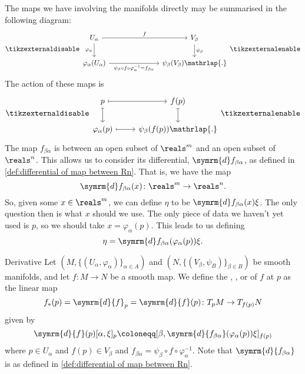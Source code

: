 \documentclass[fleqn]{NotesClass}
\renewcommand{\dl}{\symrm{d}}
\begin{document}
    The maps we have involving the manifolds directly may be summarised in the following diagram:
    \begin{equation}
        \tikzexternaldisable
        \begin{tikzcd}[column sep=2.5cm]
            U_\alpha \arrow[r, "f"] \arrow[d, "\varphi_\alpha"'] & V_\beta \arrow[d, "\psi_\beta"]\\
            \varphi_\alpha(U_\alpha) \arrow[r, "\psi_\beta \circ f \circ \varphi_\alpha^{-1} = f_{\beta\alpha}"'] & \psi_\beta(V_\beta)\mathrlap{.}
        \end{tikzcd}
        \tikzexternalenable
    \end{equation}
    The action of these maps is
    \begin{equation}
        \tikzexternaldisable
        \begin{tikzcd}
            p \arrow[r, mapsto] \arrow[d, mapsto] & f(p) \arrow[d, mapsto]\\
            \varphi_\alpha(p) \arrow[r, mapsto] & \psi_\beta(f(p))\mathrlap{.}
        \end{tikzcd}
        \tikzexternalenable
    \end{equation}
    The map \(f_{\beta\alpha}\) is between an open subset of \(\reals^m\) and an open subset of \(\reals^n\).
    This allows us to consider its differential, \(\dl f_{\beta\alpha}\), as defined in \cref{def:differential of map between Rn}.
    That is, we have the map
    \begin{equation}
        \dl f_{\beta\alpha}(x) \colon \reals^m \to \reals^n.
    \end{equation}
    So, given some \(x \in \reals^m\), we can define \(\eta\) to be \(\dl f_{\beta\alpha}(x)\xi\).
    The only question then is what \(x\) should we use.
    The only piece of data we haven't yet used is \(p\), so we should take \(x = \varphi_\alpha(p)\).
    This leads to us defining
    \begin{equation}
        \eta = \dl f_{\beta\alpha}(\varphi_\alpha(p))\xi.
    \end{equation}
    
    \begin{dfn}{Derivative}{}
        Let \((M, \{(U_\alpha, \varphi_\alpha)\}_{\alpha \in A})\) and \((N, \{(V_\beta, \psi_B	)\}_{\beta \in B})\) be smooth manifolds, and let \(f \colon M \to N\) be a smooth map.
        We define the , , or  of \(f\) at \(p\) as the linear map
        \begin{equation}
            f_*(p) = \dl{f}_p = \dl{f}(p) \colon T_pM \to T_{f(p)}N 
        \end{equation}
        given by
        \begin{equation}
            \dl{f}(p)[\alpha, \xi]_p \coloneqq [\beta, \dl{f_{\beta\alpha}}(\varphi_\alpha(p))\xi]_{f(p)}
        \end{equation}
        where \(p \in U_\alpha\) and \(f(p) \in V_\beta\) and \(f_{\beta\alpha} = \psi_\beta \circ f \circ \varphi_\alpha^{-1}\).
        Note that \(\dl{f_{\beta\alpha}}\) is as defined in \cref{def:differential of map between Rn}.
    \end{dfn}
    
\end{document}
